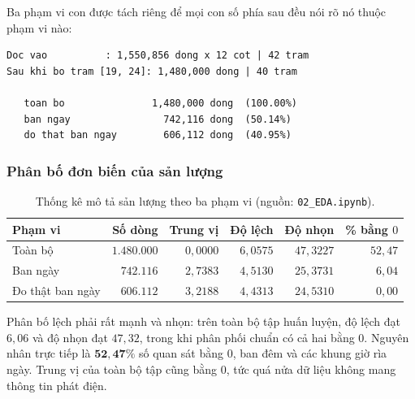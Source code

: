 Ba phạm vi con được tách riêng để mọi con số phía sau đều nói rõ nó thuộc phạm vi nào:

\begingroup
\par{}\vspace{8pt}
\small\renewcommand{\baselinestretch}{1.0}\selectfont
\begin{verbatim}
Doc vao          : 1,550,856 dong x 12 cot | 42 tram
Sau khi bo tram [19, 24]: 1,480,000 dong | 40 tram

   toan bo               1,480,000 dong  (100.00%)
   ban ngay                742,116 dong  (50.14%)
   do that ban ngay        606,112 dong  (40.95%)
\end{verbatim}
\par\vspace{8pt}
\endgroup
\subsubsection{Phân bố đơn biến của sản lượng}

\begin{table}[htbp]
\centering
\caption{Thống kê mô tả sản lượng theo ba phạm vi (nguồn: \texttt{02\_EDA.ipynb}).}
\label{tab:eda_mo_ta}
\small
\begin{tabular}{l r r r r r}
\toprule
\textbf{Phạm vi} & \textbf{Số dòng} & \textbf{Trung vị} & \textbf{Độ lệch} & \textbf{Độ nhọn} & \textbf{\% bằng $0$} \\
\midrule
Toàn bộ          & $1.480.000$ & $0{,}0000$ & $6{,}0575$ & $47{,}3227$ & $52{,}47$ \\
Ban ngày         & $742.116$   & $2{,}7383$ & $4{,}5130$ & $25{,}3731$ & $6{,}04$ \\
Đo thật ban ngày & $606.112$   & $3{,}2188$ & $4{,}4313$ & $24{,}5310$ & $0{,}00$ \\
\bottomrule
\end{tabular}
\end{table}

Phân bố lệch phải rất mạnh và nhọn: trên toàn bộ tập huấn luyện, độ lệch đạt $6{,}06$ và độ
nhọn đạt $47{,}32$, trong khi phân phối chuẩn có cả hai bằng $0$. Nguyên nhân trực tiếp là
$\mathbf{52{,}47\%}$ số quan sát bằng $0$, ban đêm và các khung giờ rìa ngày. Trung vị của
toàn bộ tập cũng bằng $0$, tức quá nửa dữ liệu không mang thông tin phát điện.

